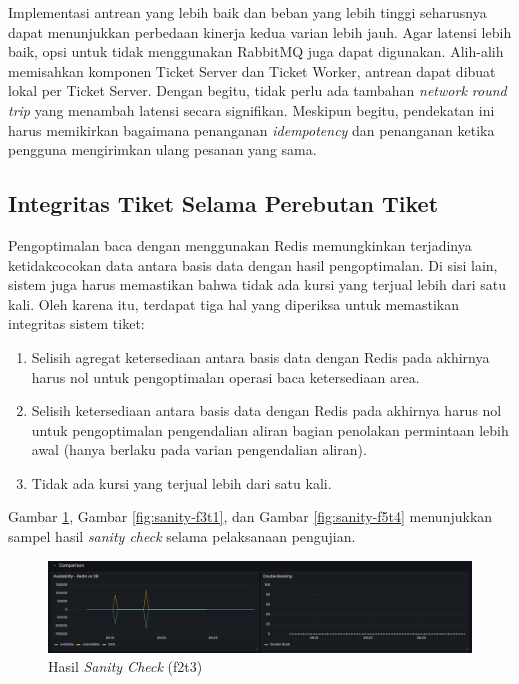 Implementasi antrean yang lebih baik dan beban yang lebih tinggi seharusnya dapat menunjukkan perbedaan kinerja kedua varian lebih jauh. Agar latensi lebih baik, opsi untuk tidak menggunakan RabbitMQ juga dapat digunakan. Alih-alih memisahkan komponen Ticket Server dan Ticket Worker, antrean dapat dibuat lokal per Ticket Server. Dengan begitu, tidak perlu ada tambahan \textit{network round trip} yang menambah latensi secara signifikan. Meskipun begitu, pendekatan ini harus memikirkan bagaimana penanganan \textit{idempotency} dan penanganan ketika pengguna mengirimkan ulang pesanan yang sama.

\subsection{Integritas Tiket Selama Perebutan Tiket}

Pengoptimalan baca dengan menggunakan Redis memungkinkan terjadinya ketidakcocokan data antara basis data dengan hasil pengoptimalan. Di sisi lain, sistem juga harus memastikan bahwa tidak ada kursi yang terjual lebih dari satu kali. Oleh karena itu, terdapat tiga hal yang diperiksa untuk memastikan integritas sistem tiket:

\begin{enumerate}
    \item Selisih agregat ketersediaan antara basis data dengan Redis pada akhirnya harus nol untuk pengoptimalan operasi baca ketersediaan area.
    \item Selisih ketersediaan antara basis data dengan Redis pada akhirnya harus nol untuk pengoptimalan pengendalian aliran bagian penolakan permintaan lebih awal (hanya berlaku pada varian pengendalian aliran).
    \item Tidak ada kursi yang terjual lebih dari satu kali.
\end{enumerate}

Gambar \ref{fig:sanity-f2t3}, Gambar \ref{fig:sanity-f3t1}, dan Gambar \ref{fig:sanity-f5t4} menunjukkan sampel hasil \textit{sanity check} selama pelaksanaan pengujian.

\begin{figure}[htbp]
    \centering
    \includegraphics[width=1\textwidth]{resources/chapter-4/sanity-f2t3.png}
    \caption{Hasil \textit{Sanity Check} (f2t3)}
    \label{fig:sanity-f2t3}
\end{figure}

